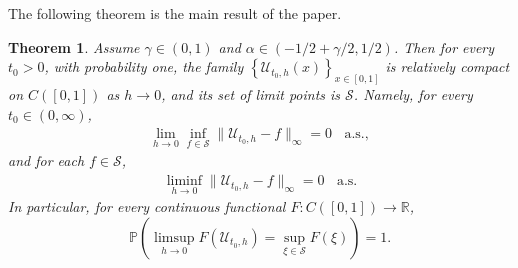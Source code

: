 \documentclass[11pt, reqno]{amsart}
\numberwithin{equation}{section}
\newtheorem{theorem}{Theorem}[section]
\newcommand{\1}{{\bf 1}}
\newcommand{\2}{{\bf 2}}
\begin{document}
The following theorem is the main result of the paper.
   \begin{theorem}\label{thm local LIL}   Assume $\gamma\in (0,1)$ and $\alpha\in(-1/2+\gamma/2, 1/2)$. Then   for every  $t_0>0$,
   with probability one,  the family $\left\{\mathcal U_{t_0, h}(x)\right\}_{x\in [0,1]}$  
   is relatively compact on $C([0,1])$ as $h\rightarrow 0$, and its set of   limit points is $\mathcal S$. Namely, for every $t_0\in
   (0,\infty)$,  
    \begin{align}\label{eq equiv1}
 \lim_{h\rightarrow 0}\inf_{f\in \mathcal S} \|\mathcal U_{t_0, h}-f \|_{\infty}=0 \ \ \ \ \text{a.s.},
 \end{align}
 and for each $f\in \mathcal S$,
    \begin{align}\label{eq equiv2}
 \liminf_{h\rightarrow 0} \|\mathcal U_{t_0, h}-f \|_{\infty}=0 \ \ \ \ \text{a.s.}
 \end{align}  
  In particular,  for every continuous functional $F: C([0,1])\rightarrow \mathbb R$,
 \begin{equation}\label{eq continuity}
 \mathbb P\left(\limsup_{h\rightarrow0} F(\mathcal U_{t_0, h})=\sup_{\xi\in \mathcal S}F(\xi) \right)=1.
 \end{equation}
 \end{theorem}
\end{document}
